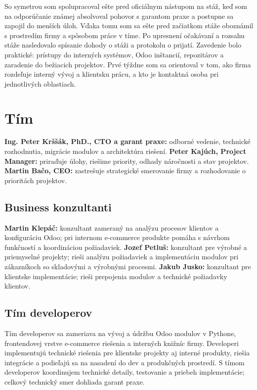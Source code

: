 \documentclass[12pt,a4paper]{article}
\begin{document}
So symetrou som spolupracoval ešte pred oficiálnym nástupom na stáž, keď som na odporúčanie známej absolvoval pohovor s garantom praxe a postupne sa zapojil do menších úloh. Vďaka tomu som sa ešte pred začiatkom stáže oboznámil s prostredím firmy a spôsobom práce v tíme. Po upresnení očakávaní a rozsahu stáže nasledovalo spísanie dohody o stáži a protokolu o prijatí. Zavedenie bolo praktické: prístupy do interných systémov, Odoo inštancií, repozitárov a zaradenie do bežiacich projektov. Prvé týždne som sa orientoval v tom, ako firma rozdeľuje interný vývoj a klientsku prácu, a kto je kontaktná osoba pri jednotlivých oblastiach.

\section{Tím}

\textbf{Ing. Peter Krššák, PhD., CTO a garant praxe:} odborné vedenie, technické rozhodnutia, migrácie modulov a architektúra riešení. \textbf{Peter Kajúch, Project Manager:} priraďuje úlohy, riešime priority, odhady náročnosti a stav projektov. \textbf{Martin Bačo, CEO:} zastrešuje strategické smerovanie firmy a rozhodovanie o prioritách projektov.

\subsection{Business konzultanti}

\textbf{Martin Klepáč:} konzultant zameraný na analýzu procesov klientov a konfiguráciu Odoo; pri internom e-commerce produkte pomáha s návrhom funkčností a koordináciou požiadaviek. \textbf{Jozef Petluš:} konzultant pre výrobné a priemyselné projekty; rieši analýzu požiadaviek a implementáciu modulov pri zákazníkoch so skladovými a výrobnými procesmi. \textbf{Jakub Jusko:} konzultant pre klientske implementácie; rieši prepojenia modulov a technické požiadavky klientov.

\subsection{Tím developerov}

Tím developerov sa zameriava na vývoj a údržbu Odoo modulov v Pythone, frontendovej vrstve e-commerce riešenia a interných knižníc firmy. Developeri implementujú technické riešenia pre klientske projekty aj interné produkty, riešia integrácie a podieľajú sa na nasadení do dev a produkčných prostredí. S tímom developerov koordinujem technické detaily, testovanie a priebeh implementácie; celkový technický smer dohliada garant praxe.
\end{document}
